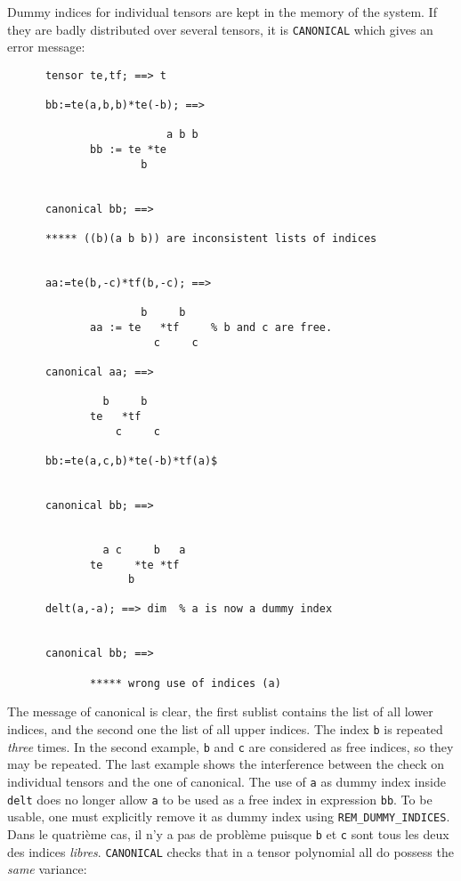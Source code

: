 Dummy indices for individual tensors are kept in the memory of
the system. If they are badly distributed over several tensors,
it is \texttt{CANONICAL} which gives an error message:
\begin{verbatim}
      tensor te,tf; ==> t

      bb:=te(a,b,b)*te(-b); ==>

                         a b b
             bb := te *te
                     b


      canonical bb; ==>

      ***** ((b)(a b b)) are inconsistent lists of indices


      aa:=te(b,-c)*tf(b,-c); ==>

                     b     b
             aa := te   *tf     % b and c are free.
                       c     c

      canonical aa; ==>

               b     b
             te   *tf
                 c     c

      bb:=te(a,c,b)*te(-b)*tf(a)$


      canonical bb; ==>


               a c     b   a
             te     *te *tf
                   b

      delt(a,-a); ==> dim  % a is now a dummy index


      canonical bb; ==>

             ***** wrong use of indices (a)
\end{verbatim}
The message of canonical is clear, the first sublist contains the
list of all lower indices, and the second one the list of all upper
indices. The index  \texttt{b} is repeated \emph{three} times.
In the second example, \texttt{b} and \texttt{c} are considered as free
indices, so they may be repeated.
The last example shows the interference between the check on
individual tensors and the one of canonical. The use of \texttt{a}
as dummy index inside \texttt{delt} does no longer allow \texttt{a}
to be used as a free index in expression \texttt{bb}.
To be usable, one must explicitly remove it as dummy index
using \texttt{REM\_DUMMY\_INDICES}.
Dans le quatri\`eme cas, il n'y a pas de probl\`eme puisque \texttt{b} et
\texttt{c} sont tous les deux des indices \emph{libres}.
\texttt{CANONICAL} checks that in a tensor polynomial
all do possess the \emph{same} variance:
